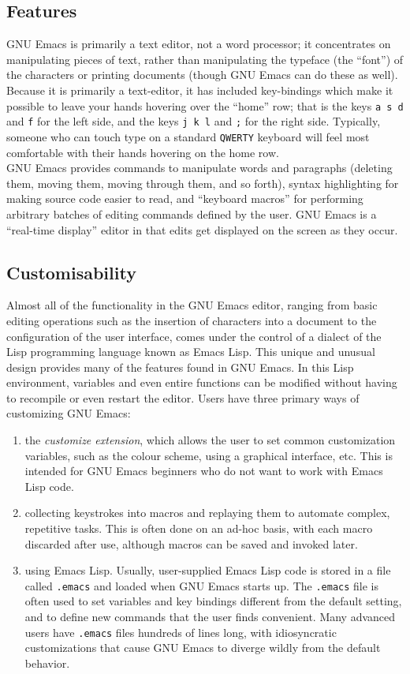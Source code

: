 \documentclass[12pt,a4paper,oneside]{article}
\begin{document}
\subsection{Features}
GNU Emacs is primarily a text editor, not a word processor; it concentrates on manipulating pieces of text, rather than manipulating the typeface (the ``font'') of the characters or printing documents (though GNU Emacs can do these as well). Because it is primarily a text-editor, it has included key-bindings which make it possible to leave your hands hovering over the ``home'' row; that is the keys \texttt{a s d} and \texttt{f} for the left side, and the keys \texttt{j k l} and \texttt{;} for the right side. Typically, someone who can touch type on a standard \texttt{QWERTY} keyboard will feel most comfortable with their hands hovering on the home row.\\

GNU Emacs provides commands to manipulate words and paragraphs (deleting them, moving them, moving through them, and so forth), syntax highlighting for making source code easier to read, and ``keyboard macros'' for performing arbitrary batches of editing commands defined by the user. GNU Emacs is a ``real-time display'' editor in that edits get displayed on the screen as they occur.

\subsection{Customisability}
Almost all of the functionality in the GNU Emacs editor, ranging from basic editing operations such as the insertion of characters into a document to the configuration of the user interface, comes under the control of a dialect of the Lisp programming language known as Emacs Lisp. This unique and unusual design provides many of the features found in GNU Emacs. In this Lisp environment, variables and even entire functions can be modified without having to recompile or even restart the editor. Users have three primary ways of customizing GNU Emacs:

\begin{enumerate}
  \item the \emph{customize extension}, which allows the user to set common customization variables, such as the colour scheme, using a graphical interface, etc. This is intended for GNU Emacs beginners who do not want to work with Emacs Lisp code.
  \item collecting keystrokes into macros and replaying them to automate complex, repetitive tasks. This is often done on an ad-hoc basis, with each macro discarded after use, although macros can be saved and invoked later.
  \item using Emacs Lisp. Usually, user-supplied Emacs Lisp code is stored in a file called \texttt{.emacs} and loaded when GNU Emacs starts up. The \texttt{.emacs} file is often used to set variables and key bindings different from the default setting, and to define new commands that the user finds convenient. Many advanced users have \texttt{.emacs} files hundreds of lines long, with idiosyncratic customizations that cause GNU Emacs to diverge wildly from the default behavior.
\end{enumerate}
\end{document}
